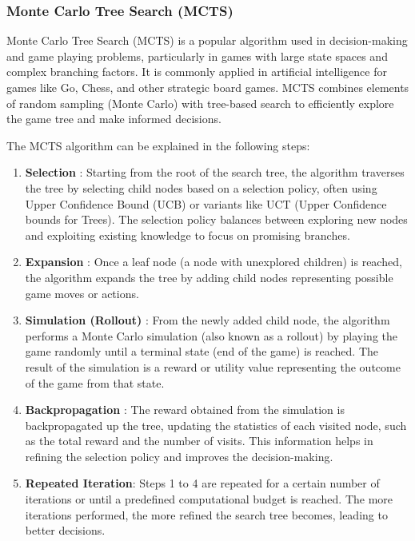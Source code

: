 \subsubsection{Monte Carlo Tree Search (MCTS)}
Monte Carlo Tree Search (MCTS) is a popular algorithm used in decision-making and game playing problems, particularly in games with large state spaces and complex branching factors. It is commonly applied in artificial intelligence for games like Go, Chess, and other strategic board games. MCTS combines elements of random sampling (Monte Carlo) with tree-based search to efficiently explore the game tree and make informed decisions.

The MCTS algorithm can be explained in the following steps:
\begin{enumerate}
    \item \textbf{Selection} : Starting from the root of the search tree, the algorithm traverses the tree by selecting child nodes based on a selection policy, often using Upper Confidence Bound (UCB) or variants like UCT (Upper Confidence bounds for Trees). The selection policy balances between exploring new nodes and exploiting existing knowledge to focus on promising branches.
    \item \textbf{Expansion} : Once a leaf node (a node with unexplored children) is reached, the algorithm expands the tree by adding child nodes representing possible game moves or actions.
    \item \textbf{Simulation (Rollout)} : From the newly added child node, the algorithm performs a Monte Carlo simulation (also known as a rollout) by playing the game randomly until a terminal state (end of the game) is reached. The result of the simulation is a reward or utility value representing the outcome of the game from that state.
    \item \textbf{Backpropagation} : The reward obtained from the simulation is backpropagated up the tree, updating the statistics of each visited node, such as the total reward and the number of visits. This information helps in refining the selection policy and improves the decision-making.
    \item \textbf{Repeated Iteration}: Steps 1 to 4 are repeated for a certain number of iterations or until a predefined computational budget is reached. The more iterations performed, the more refined the search tree becomes, leading to better decisions.
\end{enumerate}


